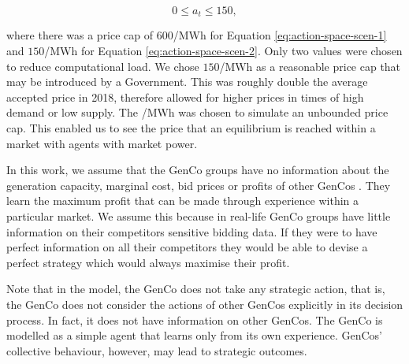 \documentclass[conference]{IEEEtran}
\begin{document}
\begin{equation}
\label{eq:action-space-scen-2}
	0 \leq a_t \leq 150,
\end{equation}


\noindent where there was a price cap of \textsterling$600$/MWh for Equation \ref{eq:action-space-scen-1} and \textsterling$150$/MWh for Equation \ref{eq:action-space-scen-2}. Only two values were chosen to reduce computational load. We chose \textsterling$150$/MWh as a reasonable price cap that may be introduced by a Government. This was roughly double the average accepted price in 2018, therefore allowed for higher prices in times of high demand or low supply. The /MWh was chosen to simulate an unbounded price cap. This enabled us to see the price that an equilibrium is reached within a market with agents with market power.  




In this work, we assume that the GenCo groups have no information about the generation capacity, marginal cost, bid prices or profits of other GenCos \cite{EsmaeiliAliabadi2017}. They learn the maximum profit that can be made through experience within a particular market. We assume this because in real-life GenCo groups have little information on their competitors sensitive bidding data. If they were to have perfect information on all their competitors they would be able to devise a perfect strategy which would always maximise their profit.





Note that in the model, the GenCo does not take any strategic action, that is, the GenCo does not consider the actions of other GenCos explicitly in its decision process. In fact, it does not have information on other GenCos. The GenCo is modelled as a simple agent that learns only from its own experience. GenCos' collective behaviour, however, may lead to strategic outcomes.\cite{EsmaeiliAliabadi2017}\\
\end{document}
